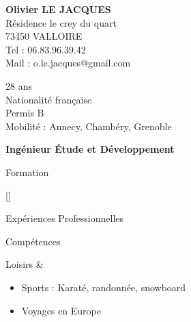 \documentclass{cv}
\newlength{\espaceChamps}
\newcommand{\educationdir}{french/education}
\newcommand{\experiencedir}{french/experience}
\newcommand{\skilldir}{french/skill}
\newlength{\firstcolumnwidth}%
\begin{document}
\begin{chapeau}
	\begin{adresse}
		\textbf{Olivier LE JACQUES}\\
		Résidence le crey du quart\\
		73450 VALLOIRE\\
		Tel : 06.83.96.39.42\\
		Mail : o.le.jacques@gmail.com\\
	\end{adresse}
	\begin{etatcivil}
		28 ans \\
        Nationalité française \\
		Permis B \\
        Mobilité : Annecy, Chambéry, Grenoble \\
	\end{etatcivil}
\end{chapeau}

\vspace{0.2cm}

\begin{center}
	\textbf{\huge{Ingénieur Étude et Développement}}
\end{center}

\vspace{0.2cm}

\begin{rubriquetableau}[\firstcolumnwidth]{Formation}
    
    
    
    
    
    [\espaceChamps] \\
\end{rubriquetableau}

\begin{rubriquetableau}[\firstcolumnwidth]{Expériences Professionnelles}
\end{rubriquetableau}

\newpage

\begin{rubriquetableau}[\firstcolumnwidth]{Compétences}
    
	
	
\end{rubriquetableau}
    
\begin{rubriquetableau}[\firstcolumnwidth]{Loisirs}
	& \begin{itemize}
		\item Sports : Karaté, randonnée, snowboard
        \item Voyages en Europe
	\end{itemize}\\
\end{rubriquetableau}
\end{document}
